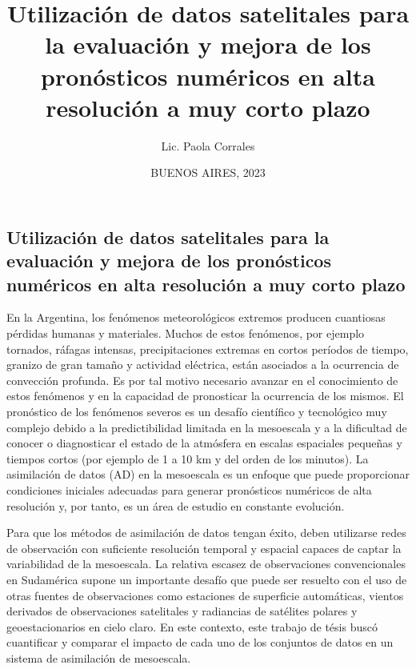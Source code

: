 \documentclass[12pt,oneside]{reedthesis}
\title{Utilización de datos satelitales para la evaluación y mejora de los pronósticos numéricos en alta resolución a muy corto plazo}
\author{Lic. Paola Corrales}
\date{BUENOS AIRES, 2023}
\begin{document}
  \maketitle

\frontmatter %
\pagestyle{empty} %
  \begin{resumen}
    \hypertarget{utilizaciuxf3n-de-datos-satelitales-para-la-evaluaciuxf3n-y-mejora-de-los-pronuxf3sticos-numuxe9ricos-en-alta-resoluciuxf3n-a-muy-corto-plazo}{%
    \section*{Utilización de datos satelitales para la evaluación y mejora de los pronósticos numéricos en alta resolución a muy corto plazo}\label{utilizaciuxf3n-de-datos-satelitales-para-la-evaluaciuxf3n-y-mejora-de-los-pronuxf3sticos-numuxe9ricos-en-alta-resoluciuxf3n-a-muy-corto-plazo}}
    
    En la Argentina, los fenómenos meteorológicos extremos producen cuantiosas pérdidas humanas y materiales. Muchos de estos fenómenos, por ejemplo tornados, ráfagas intensas, precipitaciones extremas en cortos períodos de tiempo, granizo de gran tamaño y actividad eléctrica, están asociados a la ocurrencia de convección profunda. Es por tal motivo necesario avanzar en el conocimiento de estos fenómenos y en la capacidad de pronosticar la ocurrencia de los mismos. El pronóstico de los fenómenos severos es un desafío científico y tecnológico muy complejo debido a la predictibilidad limitada en la mesoescala y a la dificultad de conocer o diagnosticar el estado de la atmósfera en escalas espaciales pequeñas y tiempos cortos (por ejemplo de 1 a 10 km y del orden de los minutos). La asimilación de datos (AD) en la mesoescala es un enfoque que puede proporcionar condiciones iniciales adecuadas para generar pronósticos numéricos de alta resolución y, por tanto, es un área de estudio en constante evolución.
    
    Para que los métodos de asimilación de datos tengan éxito, deben utilizarse redes de observación con suficiente resolución temporal y espacial capaces de captar la variabilidad de la mesoescala. La relativa escasez de observaciones convencionales en Sudamérica supone un importante desafío que puede ser resuelto con el uso de otras fuentes de observaciones como estaciones de superficie automáticas, vientos derivados de observaciones satelitales y radiancias de satélites polares y geoestacionarios en cielo claro. En este contexto, este trabajo de tésis buscó cuantificar y comparar el impacto de cada uno de los conjuntos de datos en un sistema de asimilación de mesoescala.
    

\end{resumen}
\end{document}
